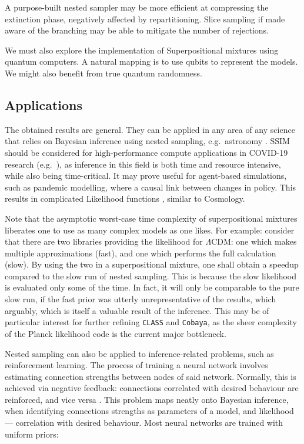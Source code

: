 \documentclass[usenatbib]{mnras}
\begin{document}
A purpose-built nested sampler may be more efficient at compressing
the extinction phase, negatively affected by repartitioning. Slice
sampling if made aware of the branching may be able to mitigate the
number of rejections. 

We must also explore the implementation of Superpositional mixtures
using quantum computers. A natural mapping is to use qubits to
represent the models. We might also benefit from true quantum
randomness.



\subsection{Applications}\label{sec:applications}
The obtained results are general. They can be applied in any area of
any science that relies on Bayesian inference using nested sampling,
e.g.~astronomy \citep{Casado_2016}. SSIM should be considered for
high-performance compute applications in COVID-19 research
(e.g.~\cite{Covid1,Covid2}), as inference in this field is both time
and resource intensive, while also being time-critical. It may prove
useful for agent-based simulations, such as pandemic modelling, where
a causal link between changes in policy. This results in complicated
Likelihood functions \citep{Covid2}, similar to Cosmology.

Note that the asymptotic worst-case time complexity of superpositional
mixtures liberates one to use as many complex models as one likes. For
example: consider that there are two libraries providing the
likelihood for \(\Lambda\)CDM: one which makes multiple approximations
(fast), and one which performs the full calculation (slow). By using
the two in a superpositional mixture, one shall obtain a speedup
compared to the slow run of nested sampling. This is because the slow
likelihood is evaluated only some of the time. In fact, it will only
be comparable to the pure slow run, if the fast prior was utterly
unrepresentative of the results, which arguably, which is itself a
valuable result of the inference. This may be of particular interest
for further refining \texttt{CLASS} and \texttt{Cobaya}, as the sheer
complexity of the Planck likelihood code is the current major
bottleneck.

Nested sampling can also be applied to inference-related problems,
such as reinforcement learning. The process of training a neural
network involves estimating connection strengths between nodes of said
network. Normally, this is achieved via negative feedback: connections
correlated with desired behaviour are reinforced, and vice versa
\cite{Kaelbling_1996}. This problem maps neatly onto Bayesian
inference, when identifying connections strengths as parameters of a
model, and likelihood --- correlation with desired behaviour. Most
neural networks are trained with uniform priors:
\end{document}
